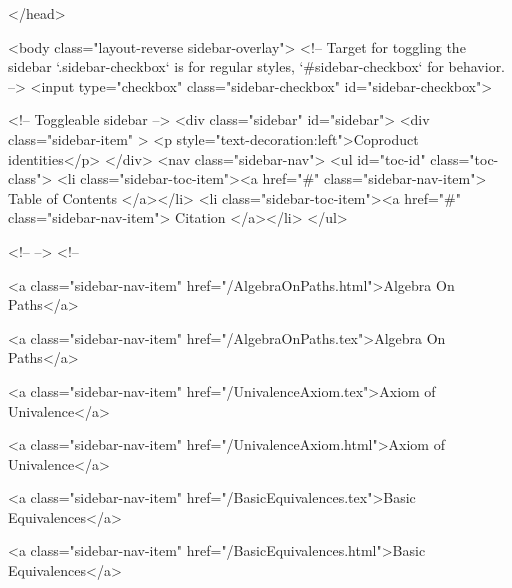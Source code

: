   
</head>




  <body class="layout-reverse sidebar-overlay">
    <!-- Target for toggling the sidebar `.sidebar-checkbox` is for regular
     styles, `#sidebar-checkbox` for behavior. -->
<input type="checkbox" class="sidebar-checkbox" id="sidebar-checkbox">

<!-- Toggleable sidebar -->
<div class="sidebar" id="sidebar">
  <div class="sidebar-item" >
    <p style="text-decoration:left">Coproduct identities</p>
  </div>
  <nav class="sidebar-nav">
    <ul id="toc-id" class="toc-class">
  <li class="sidebar-toc-item"><a href="#" class="sidebar-nav-item"> Table of Contents </a></li>
  <li class="sidebar-toc-item"><a href="#" class="sidebar-nav-item"> Citation </a></li>
</ul>


    <!--  -->
    <!-- 
      
    
      
    
      
    
      
    
      
        
      
    
      
        
          <a class="sidebar-nav-item" href="/AlgebraOnPaths.html">Algebra On Paths</a>
        
      
    
      
        
          <a class="sidebar-nav-item" href="/AlgebraOnPaths.tex">Algebra On Paths</a>
        
      
    
      
        
          <a class="sidebar-nav-item" href="/UnivalenceAxiom.tex">Axiom of Univalence</a>
        
      
    
      
        
          <a class="sidebar-nav-item" href="/UnivalenceAxiom.html">Axiom of Univalence</a>
        
      
    
      
        
          <a class="sidebar-nav-item" href="/BasicEquivalences.tex">Basic Equivalences</a>
        
      
    
      
        
          <a class="sidebar-nav-item" href="/BasicEquivalences.html">Basic Equivalences</a>
        
